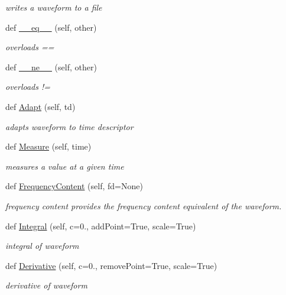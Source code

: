 \begin{DoxyCompactItemize}
\begin{DoxyCompactList}\small\item\em writes a waveform to a file \end{DoxyCompactList}\item 
def \hyperlink{classSignalIntegrity_1_1TimeDomain_1_1Waveform_1_1Waveform_1_1Waveform_ad794ff077f2f05f228a7109f3670ac40}{\+\_\+\+\_\+eq\+\_\+\+\_\+} (self, other)
\begin{DoxyCompactList}\small\item\em overloads == \end{DoxyCompactList}\item 
def \hyperlink{classSignalIntegrity_1_1TimeDomain_1_1Waveform_1_1Waveform_1_1Waveform_aa0b54a20b36fcc55e1147de88d083072}{\+\_\+\+\_\+ne\+\_\+\+\_\+} (self, other)
\begin{DoxyCompactList}\small\item\em overloads != \end{DoxyCompactList}\item 
def \hyperlink{classSignalIntegrity_1_1TimeDomain_1_1Waveform_1_1Waveform_1_1Waveform_af3655348c2535f82d246df872f0969e6}{Adapt} (self, td)
\begin{DoxyCompactList}\small\item\em adapts waveform to time descriptor \end{DoxyCompactList}\item 
def \hyperlink{classSignalIntegrity_1_1TimeDomain_1_1Waveform_1_1Waveform_1_1Waveform_a3ebba9b24670eb206a63950249f9b964}{Measure} (self, time)
\begin{DoxyCompactList}\small\item\em measures a value at a given time \end{DoxyCompactList}\item 
def \hyperlink{classSignalIntegrity_1_1TimeDomain_1_1Waveform_1_1Waveform_1_1Waveform_a3e2c4d7f2bc47844b2a80d3ddd1a04d0}{Frequency\+Content} (self, fd=None)
\begin{DoxyCompactList}\small\item\em frequency content provides the frequency content equivalent of the waveform. \end{DoxyCompactList}\item 
def \hyperlink{classSignalIntegrity_1_1TimeDomain_1_1Waveform_1_1Waveform_1_1Waveform_a47667b6657a67800a3a94d6cc492bdaa}{Integral} (self, c=0., add\+Point=True, scale=True)
\begin{DoxyCompactList}\small\item\em integral of waveform \end{DoxyCompactList}\item 
def \hyperlink{classSignalIntegrity_1_1TimeDomain_1_1Waveform_1_1Waveform_1_1Waveform_a146047cad8b2b4a9acc03e536eecf656}{Derivative} (self, c=0., remove\+Point=True, scale=True)
\begin{DoxyCompactList}\small\item\em derivative of waveform \end{DoxyCompactList}\end{DoxyCompactItemize}


